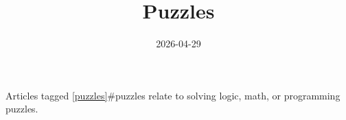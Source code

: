\documentclass{note}
\title{Puzzles}
\date{2026-04-29}
\begin{document}
Articles tagged \ref{puzzles}{#puzzles} relate to solving logic, math, or programming puzzles.
\end{document}
